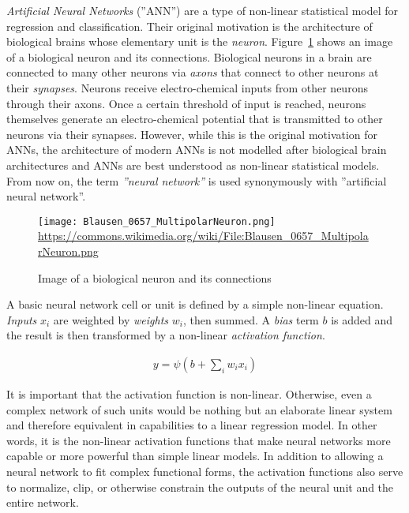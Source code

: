 \emph{Artificial Neural Networks} (''ANN'') are a type of non-linear statistical model for regression and classification. Their original motivation is the architecture of biological brains whose elementary unit is the \emph{neuron}. Figure~\ref{fig:neuron} shows an image of a biological neuron and its connections. Biological neurons in a brain are connected to many other neurons via \emph{axons} that connect to other neurons at their \emph{synapses}. Neurons receive electro-chemical inputs from other neurons through their axons. Once a certain threshold of input is reached, neurons themselves generate an electro-chemical potential that is transmitted to other neurons via their synapses. However, while this is the original motivation for ANNs, the architecture of modern ANNs is not modelled after biological brain architectures and ANNs are best understood as non-linear statistical models. From now on, the term \emph{''neural network''} is used synonymously with ''artificial neural network''.

\begin{figure}
\centering
\texttt{[image: Blausen\_0657\_MultipolarNeuron.png]}
\scriptsize \url{https://commons.wikimedia.org/wiki/File:Blausen_0657_MultipolarNeuron.png}
\caption{Image of a biological neuron and its connections}
\label{fig:neuron}
\end{figure}

A basic neural network cell or unit is defined by a simple non-linear equation. \emph{Inputs} $x_i$ are weighted by \emph{weights} $w_i$, then summed. A \emph{bias} term $b$ is added and the result is then transformed by a non-linear \emph{activation function}.

\begin{align}
y = \psi( b + \sum_i w_i x_i ) \label{eq:neuron}
\end{align}

It is important that the activation function is non-linear. Otherwise, even a complex network of such units would be nothing but an elaborate linear system and therefore equivalent in capabilities to a linear regression model. In other words, it is the non-linear activation functions that make neural networks more capable or more powerful than simple linear models. In addition to allowing a neural network to fit complex functional forms, the activation functions also serve to normalize, clip, or otherwise constrain the outputs of the neural unit and the entire network.

